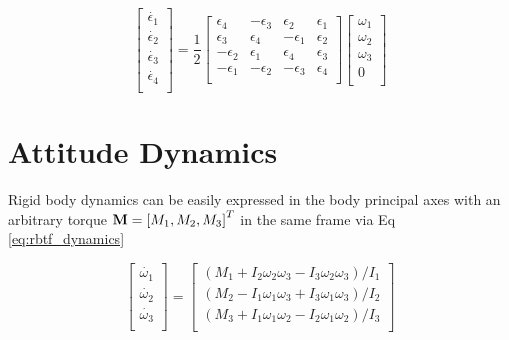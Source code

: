 \begin{equation} \label{eq:quat_kde}
    \left[\begin{matrix}\dot{\epsilon_1}\\\dot{\epsilon_2}\\\dot{\epsilon_3}\\\dot{\epsilon_4}\\\end{matrix}\right]
    =
    \frac{1}{2}\left[\begin{matrix}\epsilon_4&-\epsilon_3&\epsilon_2&\epsilon_1\\\epsilon_3&\epsilon_4&-\epsilon_1&\epsilon_2\\-\epsilon_2&\epsilon_1&\epsilon_4&\epsilon_3\\-\epsilon_1&-\epsilon_2&-\epsilon_3&\epsilon_4\\\end{matrix}\right]
    \left[\begin{matrix}\omega_1\\\omega_2\\\omega_3\\0\\\end{matrix}\right]
\end{equation} 

\section{Attitude Dynamics}

Rigid body dynamics can be easily expressed in the body principal axes with an arbitrary torque $\mathbf{M} = \left[M_1, M_2, M_3\right]^T$ in the same frame via Eq \ref{eq:rbtf_dynamics}

\begin{equation} \label{eq:rbtf_dynamics}
    \left[\begin{matrix}\dot{\omega_1}\\\dot{\omega_2}\\\dot{\omega_3}\\\end{matrix}\right]
    =
    \left[\begin{matrix}
        \left(M_1+I_2\omega_2\omega_3-I_3\omega_2\omega_3\right) / I_1 \\
        \left(M_2-I_1\omega_1\omega_3+I_3\omega_1\omega_3\right) / I_2 \\
        \left(M_3+I_1\omega_1\omega_2-I_2\omega_1\omega_2\right) / I_3 \\
    \end{matrix}\right]
\end{equation}